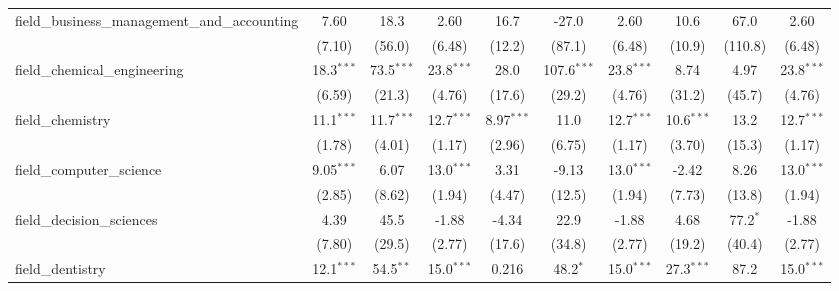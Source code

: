 \begin{tabular}{lccccccccc}
   field\_business\_management\_and\_accounting                & 7.60          & 18.3           & 2.60          & 16.7          & -27.0          & 2.60          & 10.6          & 67.0           & 2.60\\   
                                                               & (7.10)        & (56.0)         & (6.48)        & (12.2)        & (87.1)         & (6.48)        & (10.9)        & (110.8)        & (6.48)\\   
   field\_chemical\_engineering                                & 18.3$^{***}$  & 73.5$^{***}$   & 23.8$^{***}$  & 28.0          & 107.6$^{***}$  & 23.8$^{***}$  & 8.74          & 4.97           & 23.8$^{***}$\\   
                                                               & (6.59)        & (21.3)         & (4.76)        & (17.6)        & (29.2)         & (4.76)        & (31.2)        & (45.7)         & (4.76)\\   
   field\_chemistry                                            & 11.1$^{***}$  & 11.7$^{***}$   & 12.7$^{***}$  & 8.97$^{***}$  & 11.0           & 12.7$^{***}$  & 10.6$^{***}$  & 13.2           & 12.7$^{***}$\\   
                                                               & (1.78)        & (4.01)         & (1.17)        & (2.96)        & (6.75)         & (1.17)        & (3.70)        & (15.3)         & (1.17)\\   
   field\_computer\_science                                    & 9.05$^{***}$  & 6.07           & 13.0$^{***}$  & 3.31          & -9.13          & 13.0$^{***}$  & -2.42         & 8.26           & 13.0$^{***}$\\   
                                                               & (2.85)        & (8.62)         & (1.94)        & (4.47)        & (12.5)         & (1.94)        & (7.73)        & (13.8)         & (1.94)\\   
   field\_decision\_sciences                                   & 4.39          & 45.5           & -1.88         & -4.34         & 22.9           & -1.88         & 4.68          & 77.2$^{*}$     & -1.88\\   
                                                               & (7.80)        & (29.5)         & (2.77)        & (17.6)        & (34.8)         & (2.77)        & (19.2)        & (40.4)         & (2.77)\\   
   field\_dentistry                                            & 12.1$^{***}$  & 54.5$^{**}$    & 15.0$^{***}$  & 0.216         & 48.2$^{*}$     & 15.0$^{***}$  & 27.3$^{***}$  & 87.2           & 15.0$^{***}$\\   

\end{tabular}
